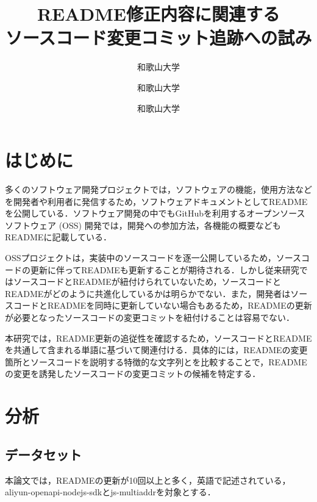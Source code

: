 \documentclass[uplatex,dvipdfmx,a4paper,twocolumn,base=11pt,jbase=11pt,ja=standard]{bxjsarticle}  %
\title{README修正内容に関連する\\ソースコード変更コミット追跡への試み}{Toward tracking source code change commits related to README revision}
\author{和歌山大学}{白﨑 優奈}{Shirasaki Yuna, Wakayama University}
\author{和歌山大学}{伊原 彰紀}{Akinori Ihara, Wakayama University}
\author{和歌山大学}{石岡 直樹}{Naoki Ishioka, Wakayama University}
\begin{document}
\maketitle


\section{はじめに}


多くのソフトウェア開発プロジェクトでは，ソフトウェアの機能，使用方法などを開発者や利用者に発信するため，ソフトウェアドキュメントとしてREADMEを公開している．ソフトウェア開発の中でもGitHubを利用するオープンソースソフトウェア (OSS) 開発では，開発への参加方法，各機能の概要などもREADMEに記載している．

OSSプロジェクトは，実装中のソースコードを逐一公開しているため，ソースコードの更新に伴ってREADMEも更新することが期待される．しかし従来研究ではソースコードとREADMEが紐付けられていないため，ソースコードとREADMEがどのように共進化しているかは明らかでない．また，開発者はソースコードとREADMEを同時に更新していない場合もあるため，READMEの更新が必要となったソースコードの変更コミットを紐付けることは容易でない．

本研究では，README更新の追従性を確認するため，ソースコードとREADMEを共通して含まれる単語に基づいて関連付ける．具体的には，READMEの変更箇所とソースコードを説明する特徴的な文字列とを比較することで，READMEの変更を誘発したソースコードの変更コミットの候補を特定する．

\section{分析}


\subsection{データセット}



本論文では，READMEの更新が10回以上と多く，英語で記述されている，aliyun-openapi-nodejs-sdkとjs-multiaddrを対象とする．
\end{document}
